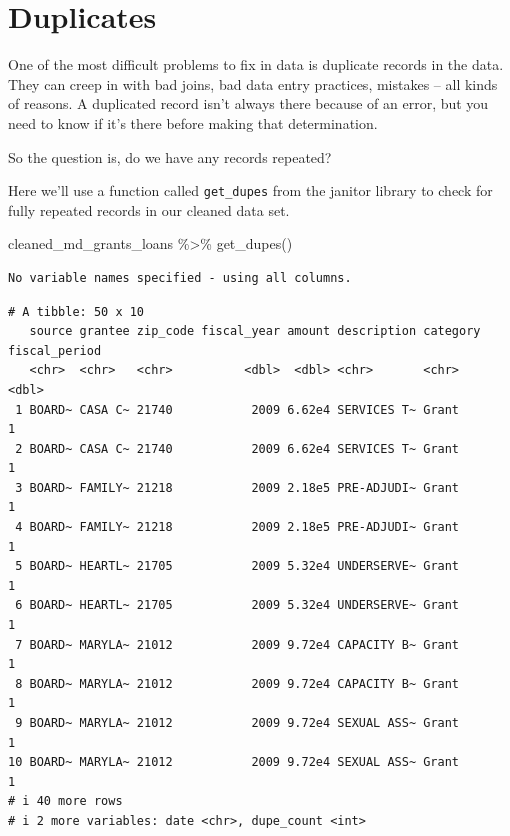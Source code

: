 \documentclass[
  letterpaper,
  DIV=11,
  numbers=noendperiod]{scrreprt}
\newenvironment{Shaded}{\begin{snugshade}}{\end{snugshade}}
\newcommand{\FunctionTok}[1]{\textcolor[rgb]{0.28,0.35,0.67}{#1}}
\newcommand{\NormalTok}[1]{\textcolor[rgb]{0.00,0.23,0.31}{#1}}
\newcommand{\SpecialCharTok}[1]{\textcolor[rgb]{0.37,0.37,0.37}{#1}}
\begin{document}
\hypertarget{duplicates}{%
\section{Duplicates}\label{duplicates}}

One of the most difficult problems to fix in data is duplicate records
in the data. They can creep in with bad joins, bad data entry practices,
mistakes -- all kinds of reasons. A duplicated record isn't always there
because of an error, but you need to know if it's there before making
that determination.

So the question is, do we have any records repeated?

Here we'll use a function called \texttt{get\_dupes} from the janitor
library to check for fully repeated records in our cleaned data set.

\begin{Shaded}
\begin{Highlighting}[]
\NormalTok{cleaned\_md\_grants\_loans }\SpecialCharTok{\%\textgreater{}\%}
  \FunctionTok{get\_dupes}\NormalTok{()}
\end{Highlighting}
\end{Shaded}

\begin{verbatim}
No variable names specified - using all columns.
\end{verbatim}

\begin{verbatim}
# A tibble: 50 x 10
   source grantee zip_code fiscal_year amount description category fiscal_period
   <chr>  <chr>   <chr>          <dbl>  <dbl> <chr>       <chr>            <dbl>
 1 BOARD~ CASA C~ 21740           2009 6.62e4 SERVICES T~ Grant                1
 2 BOARD~ CASA C~ 21740           2009 6.62e4 SERVICES T~ Grant                1
 3 BOARD~ FAMILY~ 21218           2009 2.18e5 PRE-ADJUDI~ Grant                1
 4 BOARD~ FAMILY~ 21218           2009 2.18e5 PRE-ADJUDI~ Grant                1
 5 BOARD~ HEARTL~ 21705           2009 5.32e4 UNDERSERVE~ Grant                1
 6 BOARD~ HEARTL~ 21705           2009 5.32e4 UNDERSERVE~ Grant                1
 7 BOARD~ MARYLA~ 21012           2009 9.72e4 CAPACITY B~ Grant                1
 8 BOARD~ MARYLA~ 21012           2009 9.72e4 CAPACITY B~ Grant                1
 9 BOARD~ MARYLA~ 21012           2009 9.72e4 SEXUAL ASS~ Grant                1
10 BOARD~ MARYLA~ 21012           2009 9.72e4 SEXUAL ASS~ Grant                1
# i 40 more rows
# i 2 more variables: date <chr>, dupe_count <int>
\end{verbatim}
\end{document}
